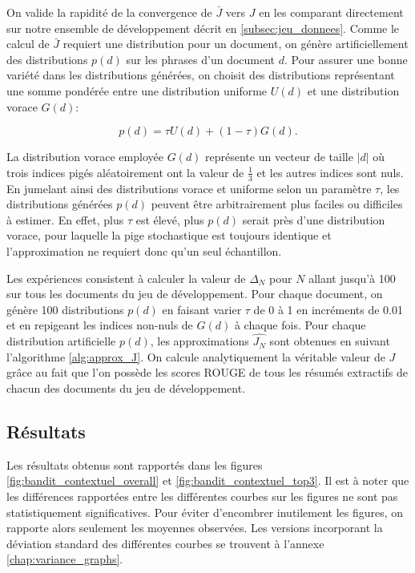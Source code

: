 On valide la rapidité de la convergence de $\bar{J}$ vers $J$ en les comparant
directement sur notre ensemble de développement décrit en \ref{subsec:jeu_donnees}.
Comme le calcul de $\bar{J}$ requiert une distribution pour un document,
on génère artificiellement des distributions $p(d)$ sur les phrases d'un document $d$.
Pour assurer une bonne variété dans les distributions générées, on choisit des
distributions représentant une somme pondérée entre une distribution uniforme
$U(d)$ et une distribution vorace $G(d)$:

\begin{equation}
    p(d) = \tau U(d) + (1 - \tau) G(d).
\end{equation}

La distribution vorace employée $G(d)$ représente un vecteur de taille $|d|$ où trois indices 
pigés aléatoirement ont la valeur de $\frac{1}{3}$ et les autres indices sont nuls.
En jumelant ainsi des distributions vorace et uniforme selon un paramètre $\tau$,
les distributions générées $p(d)$ peuvent être arbitrairement plus faciles ou difficiles 
à estimer.
En effet, plus $\tau$ est élevé, plus $p(d)$ serait près d'une distribution 
vorace, pour laquelle la pige stochastique est toujours identique et l'approximation 
ne requiert donc qu'un seul échantillon.

Les expériences consistent à calculer la valeur de $\Delta_N$ pour $N$ 
allant jusqu'à 100 sur tous les documents du jeu de développement.
Pour chaque document, on génère 100 distributions $p(d)$
en faisant varier $\tau$ de 0 à 1 en incréments de 0.01 et en repigeant les indices 
non-nuls de $G(d)$ à chaque fois.
Pour chaque distribution artificielle $p(d)$, les approximations $\hat{J_N}$ sont
 obtenues en suivant l'algorithme \ref{alg:approx_J}.
On calcule analytiquement la véritable valeur de $J$ grâce au fait que l'on possède
 les scores ROUGE de tous les résumés extractifs de chacun des documents 
 du jeu de développement.

\subsection{Résultats}

Les résultats obtenus sont rapportés dans les figures \ref{fig:bandit_contextuel_overall}
et \ref{fig:bandit_contextuel_top3}.
Il est à noter que les différences rapportées entre les différentes 
courbes sur les figures ne sont pas statistiquement significatives.
Pour éviter d'encombrer inutilement les figures, on rapporte alors 
seulement les moyennes observées.
Les versions incorporant la déviation standard des différentes courbes 
se trouvent à l'annexe \ref{chap:variance_graphs}.

